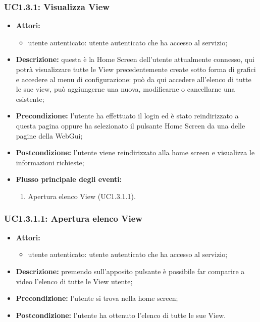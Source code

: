 \subsubsection{UC1.3.1: Visualizza View}

\begin{itemize}
	\item \textbf{Attori:}
	\begin{itemize}
		\item utente autenticato: utente autenticato che ha accesso al servizio;
	\end{itemize}
	\item \textbf{Descrizione:} questa è la Home Screen dell'utente attualmente connesso, qui potrà visualizzare tutte le View precedentemente create sotto forma di grafici e accedere al menu di configurazione: può da qui accedere all'elenco di tutte le sue view, può aggiungerne una nuova, modificarne o cancellarne una esistente;
	\item \textbf{Precondizione:} l'utente ha effettuato il login ed è stato reindirizzato a questa pagina oppure ha selezionato il pulsante Home Screen da una delle pagine della WebGui;
	\item \textbf{Postcondizione:} l'utente viene reindirizzato alla home screen e visualizza le informazioni richieste;
	\item \textbf{Flusso principale degli eventi:}
	\begin{enumerate}
		\item Apertura elenco View (UC1.3.1.1).
	\end{enumerate}
\end{itemize}
\subsubsection{UC1.3.1.1: Apertura elenco View}

\begin{itemize}
	\item \textbf{Attori:}
	\begin{itemize}
		\item utente autenticato: utente autenticato che ha accesso al servizio;
	\end{itemize}
	\item \textbf{Descrizione:} premendo sull'apposito pulsante è possibile far comparire a video l'elenco di tutte le View utente;
	\item \textbf{Precondizione:} l'utente si trova nella home screen;
	\item \textbf{Postcondizione:} l'utente ha ottenuto l'elenco di tutte le sue View.
\end{itemize}

